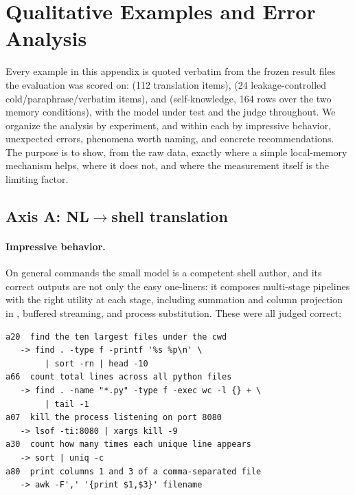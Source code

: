 \section{Qualitative Examples and Error Analysis}
\label{app:examples}

Every example in this appendix is quoted verbatim from the frozen result files the
evaluation was scored on:  (112 translation items),
 (24 leakage-controlled cold/paraphrase/verbatim items), and
 (self-knowledge, 164 rows over the two memory conditions), with the
model under test  and the judge 
throughout. We organize
the analysis by experiment, and within each by impressive behavior, unexpected errors,
phenomena worth naming, and concrete recommendations. The purpose is to show, from the
raw data, exactly where a simple local-memory mechanism helps, where it does not, and
where the measurement itself is the limiting factor.

\subsection{Axis A: NL$\rightarrow$shell translation}

\paragraph{Impressive behavior.}
On general commands the small model is a competent shell author, and its correct outputs
are not only the easy one-liners: it composes multi-stage pipelines with the right
utility at each stage, including summation and column projection in , buffered
streaming, and process substitution. These were all judged correct:

\begin{footnotesize}
\begin{verbatim}
a20  find the ten largest files under the cwd
   -> find . -type f -printf '%s %p\n' \
        | sort -rn | head -10
a66  count total lines across all python files
   -> find . -name "*.py" -type f -exec wc -l {} + \
        | tail -1
a07  kill the process listening on port 8080
   -> lsof -ti:8080 | xargs kill -9
a30  count how many times each unique line appears
   -> sort | uniq -c
a80  print columns 1 and 3 of a comma-separated file
   -> awk -F',' '{print $1,$3}' filename
\end{verbatim}
\end{footnotesize}

